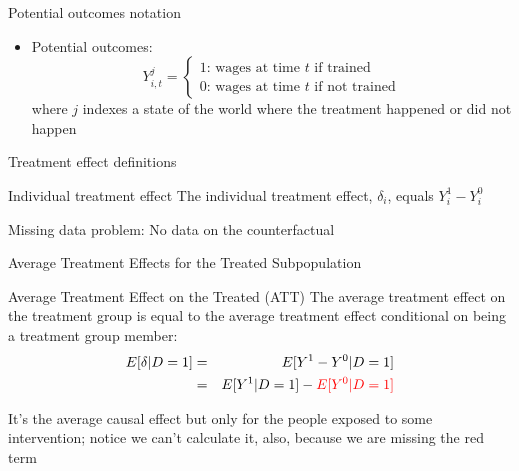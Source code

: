 \documentclass{beamer}
\begin{document}
\begin{frame}{Potential outcomes notation}
	
	\begin{itemize}

	\item Potential outcomes: $$Y_{i,t}^j =\begin{cases} 1 \text{: wages at time $t$ if trained} \\ 0 \text{: wages at time $t$ if not trained} \end{cases}$$where $j$ indexes a state of the world where the treatment happened or did not happen

	\end{itemize}
\end{frame}



\begin{frame}{Treatment effect definitions}


	\begin{block}{Individual treatment effect}
	    The individual treatment effect,  $\delta_i$, equals $Y_i^1-Y_i^0$
	\end{block}

Missing data problem:  No data on the counterfactual 
	
\end{frame}


\begin{frame}{Average Treatment Effects for the Treated Subpopulation}	
	\begin{block}{Average Treatment Effect on the Treated (ATT)}
	The average treatment effect on the treatment group is equal to the average treatment effect conditional on being a treatment group member:
		\begin{eqnarray*}
		E[\delta|D=1]&=&E[Y^1-Y^0|D=1] \nonumber \\
		&=&E[Y^1|D=1]-\textcolor{red}{E[Y^0|D=1]}
		\end{eqnarray*}
	\end{block}
	
	\bigskip

It's the average causal effect but only for the people exposed to some intervention; notice we can't calculate it, also, because we are missing the red term

	
\end{frame}
\end{document}

